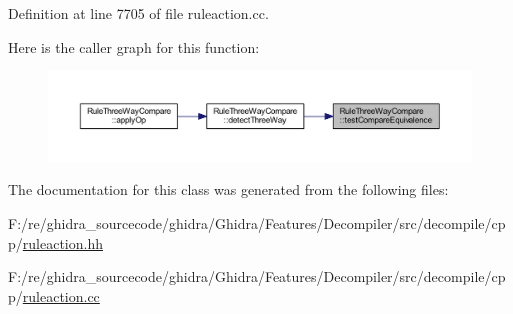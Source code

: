 Definition at line 7705 of file ruleaction.\+cc.

Here is the caller graph for this function\+:
\nopagebreak
\begin{figure}[H]
\begin{center}
\leavevmode
\includegraphics[width=350pt]{class_rule_three_way_compare_a247d3ecba480bc52cf0240e5932c5e6f_icgraph}
\end{center}
\end{figure}


The documentation for this class was generated from the following files\+:\begin{DoxyCompactItemize}
\item 
F\+:/re/ghidra\+\_\+sourcecode/ghidra/\+Ghidra/\+Features/\+Decompiler/src/decompile/cpp/\mbox{\hyperlink{ruleaction_8hh}{ruleaction.\+hh}}\item 
F\+:/re/ghidra\+\_\+sourcecode/ghidra/\+Ghidra/\+Features/\+Decompiler/src/decompile/cpp/\mbox{\hyperlink{ruleaction_8cc}{ruleaction.\+cc}}\end{DoxyCompactItemize}
